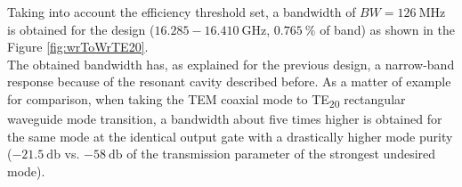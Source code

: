 \documentclass[english,twoside]{article}
\begin{document}
		Taking into account the efficiency threshold set, a bandwidth of $BW=\SI{126}{\mega\hertz}$ is obtained for the design ($\num{16.285}-\SI{16.410}{\giga\hertz}$, $\SI{0.765}{\percent}$ of band) as shown in the Figure \ref{fig:wrToWrTE20}.\\
    
    The obtained bandwidth has, as explained for the previous design, a narrow-band response because of the resonant cavity described before. As a matter of example for comparison, when taking the \ac{TEM} coaxial mode to \ac{TE}\textsubscript{20} rectangular waveguide mode transition, a bandwidth about five times higher is obtained for the same mode at the identical output gate with a drastically higher mode purity ($\SI{-21.5}{\decibel}$ vs. $\SI{-58}{\decibel}$ of the transmission parameter of the strongest undesired mode).
	
\end{document}
